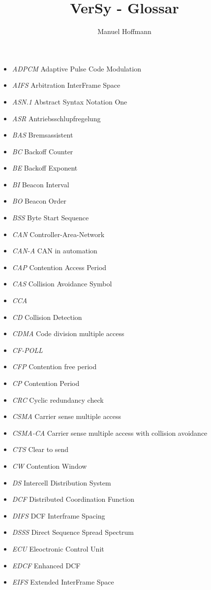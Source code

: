 \documentclass{article}
\title{VerSy - Glossar}
\author{Manuel Hoffmann}
\begin{document}
\begin{itemize}
	\item \emph{ADPCM} Adaptive Pulse Code Modulation
	\item \emph{AIFS} Arbitration InterFrame Space
	\item \emph{ASN.1} Abstract Syntax Notation One
	\item \emph{ASR} Antriebsschlupfregelung
	\item \emph{BAS} Bremsassistent
	\item \emph{BC} Backoff Counter
	\item \emph{BE} Backoff Exponent
	\item \emph{BI} Beacon Interval
	\item \emph{BO} Beacon Order
	\item \emph{BSS} Byte Start Sequence
	\item \emph{CAN} Controller-Area-Network
	\item \emph{CAN-A} CAN in automation
	\item \emph{CAP} Contention Access Period
	\item \emph{CAS} Collision Avoidance Symbol
	\item \emph{CCA} 
	\item \emph{CD} Collision Detection
	\item \emph{CDMA} Code division multiple access
	\item \emph{CF-POLL}
	\item \emph{CFP} Contention free period
	\item \emph{CP} Contention Period
	\item \emph{CRC} Cyclic redundancy check
	\item \emph{CSMA} Carrier sense multiple access
	\item \emph{CSMA-CA} Carrier sense multiple access with collision avoidance
	\item \emph{CTS} Clear to send
	\item \emph{CW} Contention Window
	\item \emph{DS} Intercell Distribution System
	\item \emph{DCF} Distributed Coordination Function
	\item \emph{DIFS} DCF Interframe Spacing
	\item \emph{DSSS} Direct Sequence Spread Spectrum
	\item \emph{ECU} Eleoctronic Control Unit
	\item \emph{EDCF} Enhanced DCF
	\item \emph{EIFS} Extended InterFrame Space

\end{itemize}
\end{document}
